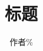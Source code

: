 \documentclass{beamer}
\begin{document}

\begin{CJK}{UTF8}{song}
    \title{标题}
    \author{作者\%}
    \maketitle

    
    

\end{CJK}
\end{document}
